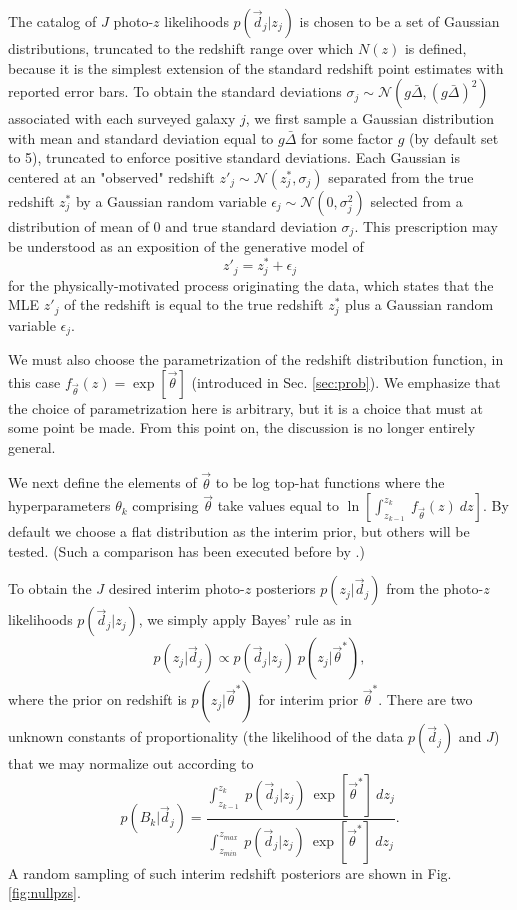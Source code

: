 \documentclass[preprint]{aastex}
\begin{document}
The catalog of $J$ photo-$z$ likelihoods $p(\vec{d}_{j}|z_{j})$ is chosen to be 
a set of Gaussian distributions, truncated to the redshift range over which 
$N(z)$ is defined, because it is the simplest extension of the standard 
redshift point estimates with reported error bars.  To obtain the standard 
deviations $\sigma_{j}\sim\mathcal{N}(g\bar{\Delta},(g\bar{\Delta})^{2})$ 
associated with each surveyed galaxy $j$, we first sample a Gaussian 
distribution with mean and standard deviation equal to $g\bar{\Delta}$ for some 
factor $g$ (by default set to 5), truncated to enforce positive standard 
deviations.  Each Gaussian is centered at an "observed" redshift 
$z'_{j}\sim\mathcal{N}(z^{*}_{j},\sigma_{j})$ separated from the true redshift 
$z^{*}_{j}$ by a Gaussian random variable 
$\epsilon_{j}\sim\mathcal{N}(0,\sigma^{2}_{j})$ selected from a distribution of 
mean of 0 and true standard deviation $\sigma_{j}$.   This prescription may be 
understood as an exposition of the generative model of 
\begin{equation}
\label{eq:genmod}
z'_{j} = z^{*}_{j}+\epsilon_{j}
\end{equation}
for the physically-motivated process originating the data, which states that 
the MLE $z'_{j}$ of the redshift is equal to the true redshift $z^{*}_{j}$ plus 
a Gaussian random variable $\epsilon_{j}$.

We must also choose the parametrization of the redshift distribution function, 
in this case $f_{\vec{\theta}}(z)=\exp[\vec{\theta}]$ (introduced in Sec. 
\ref{sec:prob}).   We emphasize that the choice of parametrization here is 
arbitrary, but it is a choice that must at some point be made.  From this point 
on, the discussion is no longer entirely general.  

We next define the elements of $\vec{\theta}$ to be log top-hat functions where 
the hyperparameters $\theta_{k}$ comprising $\vec{\theta}$ take values equal to 
$\ln[\int_{z_{k-1}}^{z_{k}}\ f_{\vec{\theta}}(z)\ dz]$.  By default we choose a 
flat distribution as the interim prior, but others will be tested.  (Such a 
comparison has been executed before by \citet{Viironen2015}.)

To obtain the $J$ desired interim photo-$z$ posteriors $p(z_{j}|\vec{d}_{j})$ 
from the photo-$z$ likelihoods $p(\vec{d}_{j}|z_{j})$, we simply apply Bayes' 
rule as in 
\begin{equation}
\label{eq:likpost}
p(z_{j}|\vec{d}_{j}) \propto p(\vec{d}_{j}|z_{j})\ p(z_{j}|\vec{\theta}^{*}),
\end{equation}
where the prior on redshift is $p(z_{j}|\vec{\theta}^{*})$ for interim prior 
$\vec{\theta}^{*}$.  There are two unknown constants of proportionality (the 
likelihood of the data $p(\vec{d}_{j})$ and $J$) that we may normalize out 
according to 
\begin{equation}
\label{eq:norm}
p(B_{k}|\vec{d}_{j}) = \frac{\int_{z_{k-1}}^{z_{k}}\ p(\vec{d}_{j}|z_{j})\ 
\exp[\vec{\theta}^{*}]\ dz_{j}}{\int_{z_{min}}^{z_{max}}\ p(\vec{d}_{j}|z_{j})\ 
\exp[\vec{\theta}^{*}]\ dz_{j}}.
\end{equation}
A random sampling of such interim redshift posteriors are shown in Fig. 
\ref{fig:nullpzs}.  
\end{document}
